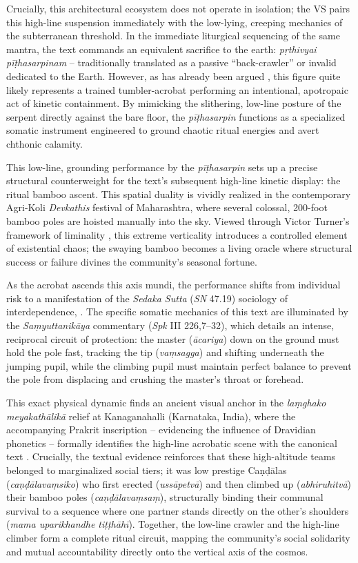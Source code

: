 \documentclass[11pt,twoside,letterpaper]{article}
\begin{document}
Crucially, this architectural ecosystem does not operate in isolation; the VS pairs this high-line suspension immediately with the low-lying, creeping mechanics of the subterranean threshold. In the immediate liturgical sequencing of the same mantra, the text commands an equivalent sacrifice to the earth: \textit{pṛthivyai pīṭhasarpinam} -- traditionally translated as a passive ``back-crawler'' or invalid dedicated to the Earth. However, as has already been  argued \cite{mccartney2025}, this figure quite likely represents a trained tumbler-acrobat performing an intentional, apotropaic act of kinetic containment. By mimicking the slithering, low-line posture of the serpent directly against the bare floor, the \textit{pīṭhasarpin} functions as a specialized somatic instrument engineered to ground chaotic ritual energies and avert chthonic calamity.

This low-line, grounding performance by the \textit{pīṭhasarpin} sets up a precise structural counterweight for the text's subsequent high-line kinetic display: the ritual bamboo ascent. This spatial duality is vividly realized in the contemporary Agri-Koli \textit{Devkathis} festival of Maharashtra, where several colossal, 200-foot bamboo poles are hoisted manually into the sky. Viewed through Victor Turner's framework of liminality \cite{Turner1969}, this extreme verticality introduces a controlled element of existential chaos; the swaying bamboo becomes a living oracle where structural success or failure divines the community's seasonal fortune. 

As the acrobat ascends this axis mundi, the performance shifts from individual risk to a manifestation of the \textit{Sedaka Sutta} (\textit{SN} 47.19) sociology of interdependence, \citep{gretil_samyutta5}. The specific somatic mechanics of this text are illuminated by the \textit{Saṃyuttanikāya} commentary (\textit{Spk} III 226,7–32), which details an intense, reciprocal circuit of protection: the master (\textit{ācariya}) down on the ground must hold the pole fast, tracking the tip (\textit{vaṃsagga}) and shifting underneath the jumping pupil, while the climbing pupil must maintain perfect balance to prevent the pole from displacing and crushing the master's throat or forehead. 

This exact physical dynamic finds an ancient visual anchor in the \textit{laṃghako meyakathālikā} relief at Kanaganahalli (Karnataka, India), where the accompanying Prakrit inscription -- evidencing the influence of Dravidian phonetics -- formally identifies the high-line acrobatic scene with the canonical text \citep{vonHinuber2016}. Crucially, the textual evidence reinforces that these high-altitude teams belonged to marginalized social tiers; it was low prestige Caṇḍālas (\textit{caṇḍālavaṃsiko}) who first erected (\textit{ussāpetvā}) and then climbed up (\textit{abhiruhitvā}) their bamboo poles (\textit{caṇḍālavaṃsaṃ}), structurally binding their communal survival to a sequence where one partner stands directly on the other's shoulders (\textit{mama uparikhandhe tiṭṭhāhī}). Together, the low-line crawler and the high-line climber form a complete ritual circuit, mapping the community's social solidarity and mutual accountability directly onto the vertical axis of the cosmos.
\end{document}
